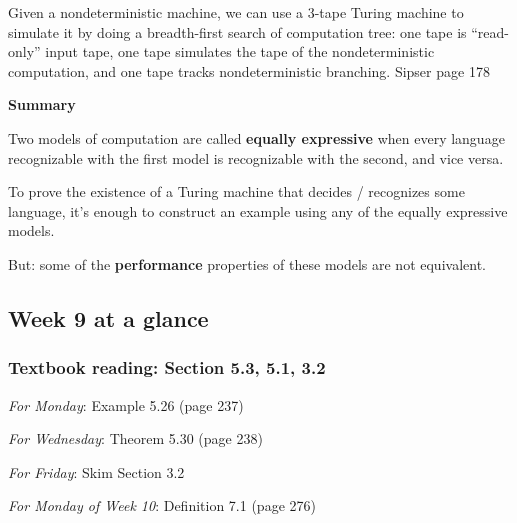 \documentclass[12pt, oneside]{article}
\begin{document}
Given a nondeterministic machine, we can use a $3$-tape Turing machine to 
simulate it by doing a breadth-first search of computation tree: one tape 
is ``read-only'' input tape, one tape simulates the tape of the nondeterministic
computation, and one tape tracks nondeterministic branching. {\tiny Sipser page 178} 

\vfill

{\bf Summary}

Two models of computation are called {\bf equally expressive} when 
every language recognizable with the first model is recognizable with the second, and vice versa.

To prove the existence of a Turing machine that decides / recognizes some language, 
it's enough to construct an example using any of the equally expressive models.

But: some of the {\bf performance} properties of these models are not equivalent.

\vfill 
\newpage

\subsection*{Week 9 at a glance}

\subsubsection*{Textbook reading: Section 5.3, 5.1, 3.2}

{\it For Monday}: Example 5.26 (page 237)

{\it For Wednesday}: Theorem 5.30 (page 238)

{\it For Friday}: Skim Section 3.2

{\it For Monday of Week 10}: Definition 7.1 (page 276)
\end{document}
